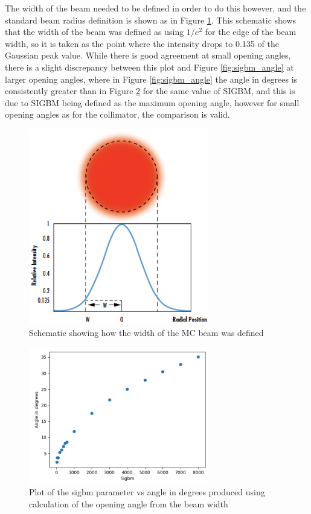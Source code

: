 The width of the beam needed to be defined in order to do this however, and the standard beam radius definition is shown as in Figure \ref{fig:beam_width}. This schematic shows that the width of the beam was defined as using $1/e^2$ for the edge of the beam width, so it is taken as the point where the intensity drops to 0.135 of the Gaussian peak value. While there is good agreement at small opening angles, there is a slight discrepancy between this plot and Figure \ref{fig:sigbm_angle} at larger opening angles, where in Figure \ref{fig:sigbm_angle} the angle in degrees is consistently greater than in Figure \ref{fig:sigbm_angle_validation} for the same value of SIGBM, and this is due to SIGBM being defined as the maximum opening angle, however for small opening angles as for the collimator, the comparison is valid.

\begin{figure}
    \centering
    \includegraphics[width=0.7\textwidth]{Figures/beam_width.PNG}
    \caption{Schematic showing how the width of the MC beam was defined}
    \label{fig:beam_width}
\end{figure}

\begin{figure}
    \centering
    \includegraphics[width=0.7\textwidth]{Figures/sigbm_angle_validation.PNG}
    \caption{Plot of the sigbm parameter vs angle in degrees produced using calculation of the opening angle from the beam width}
    \label{fig:sigbm_angle_validation}
\end{figure}

